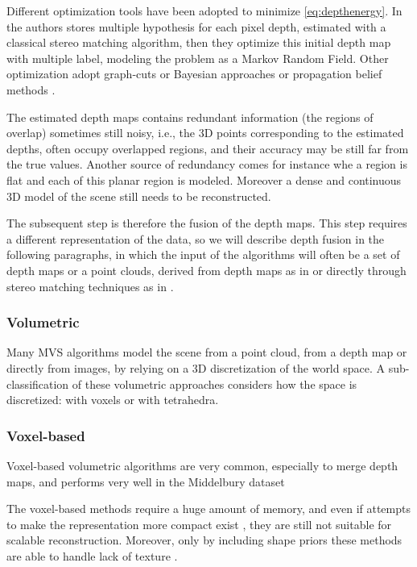 Different optimization tools have been adopted to minimize \eqref{eq:depthenergy}. In \cite{campbell2008using} the authors stores multiple hypothesis for each pixel depth, estimated with a classical stereo matching algorithm, then they optimize this initial depth map with multiple label, modeling the problem as a Markov Random Field. Other optimization adopt graph-cuts \cite{kolmogorov2002multi} or Bayesian approaches \cite{strecha2006combined,gargallo2005bayesian} or propagation belief methods \cite{fu10,goesele2007multi,Tola12}.



The estimated depth maps contains redundant information (the regions of overlap) sometimes still noisy, i.e., the 3D points corresponding to the estimated depths, often occupy overlapped regions, and their accuracy may be still far from the true values. Another source of redundancy comes for instance whe a region is flat and each of this planar region is modeled. Moreover a dense and continuous 3D model of the scene still needs to be reconstructed.

The subsequent step is therefore the fusion of the depth maps. This step requires a different representation of the data, so we will describe depth fusion in the following paragraphs, in which the input of the algorithms will often be a set of depth maps or a point clouds, derived from depth maps as in \cite{bradley2008accurate} or directly through stereo matching techniques as in \cite{labatut2007efficient,vu_et_al_2012}.


\subsubsection{Volumetric}
Many MVS algorithms model the scene from a point cloud, from a depth map or directly from images, by relying on a 3D discretization of the world space.
A sub-classification of these volumetric approaches considers how the space is discretized: with voxels or with tetrahedra.


\subsubsection{Voxel-based}
Voxel-based volumetric algorithms are very common, especially to merge depth maps, and performs very well in the Middelbury dataset \cite{}

The voxel-based methods  require a huge amount of memory, and even if attempts to make the representation more compact exist \cite{steinbrucker2014volumetric}, they are still not suitable for scalable reconstruction.
Moreover, only by including shape priors these methods are able to handle lack of texture \cite{karimi2015segment}.



